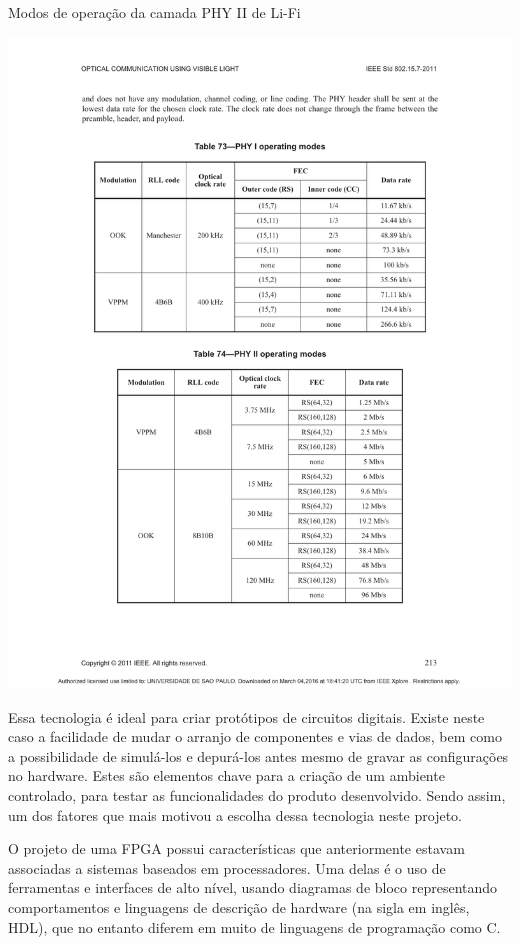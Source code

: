 	\begin{table}[htbp]
		\caption{\label{tab_phy2} Modos de operação da camada PHY II de Li-Fi}
		\centering
			\includegraphics[clip, trim=46.55mm 36.79mm 46.74mm 142.30mm,  width=1.00\textwidth]{pag213.pdf}
	\end{table}
	
	Essa tecnologia é ideal para criar protótipos de circuitos digitais. Existe neste caso a facilidade de mudar o arranjo de componentes e vias de dados, bem como a possibilidade de simulá-los e depurá-los antes mesmo de gravar as configurações no hardware. Estes são elementos chave para a criação de um ambiente controlado, para testar as funcionalidades do produto desenvolvido. Sendo assim, um dos fatores que mais motivou a escolha dessa tecnologia neste projeto.
	
	O projeto de uma FPGA possui características que anteriormente estavam associadas a sistemas baseados em processadores. Uma delas é o uso de ferramentas e interfaces de alto nível, usando diagramas de bloco representando comportamentos e linguagens de descrição de hardware (na sigla em inglês, HDL), que no entanto diferem em muito de linguagens de programação como C. 
	
